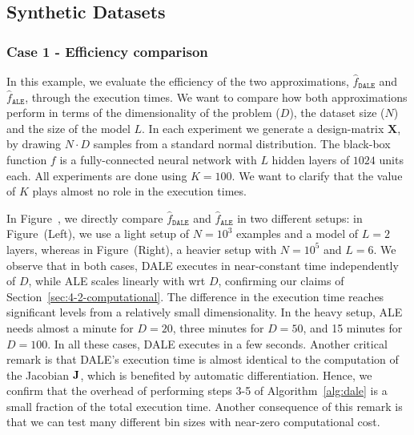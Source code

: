 \documentclass[wcp]{jmlr}
\newcommand{\dale}{\hat{f}_{\mathtt{DALE}}}
\begin{document}
\subsection{Synthetic Datasets}
\label{sec:5-1-artificial-experiments}
\subsubsection{Case 1 - Efficiency comparison}
\label{sec:case-1}

In this example, we evaluate the efficiency of the two approximations,
\(\dale\) and \(\hat{f}_{\mathtt{ALE}}\), through the
execution times. We want to compare how both approximations perform in
terms of the dimensionality of the problem (\(D\)), the dataset size
(\(N\)) and the size of the model \(L\). In each experiment we
generate a design-matrix \( \mathbf{X} \), by drawing \( N \cdot D \)
samples from a standard normal distribution. The black-box function
\(f \) is a fully-connected neural network with \(L\) hidden layers of
\( 1024 \) units each. All experiments are done using \(K=100\). We
want to clarify that the value of \(K\) plays almost no role in the
execution times.

In Figure~, we directly compare
\(\dale\) and \(\hat{f}_{\mathtt{ALE}}\) in two different
setups: in Figure~(Left), we use a light setup
of \(N=10^3\) examples and a model of \(L=2\) layers, whereas in
Figure~(Right), a heavier setup with
\(N=10^5\) and \(L=6\). We observe that in both cases, DALE executes
in near-constant time independently of \(D\), while ALE scales
linearly with wrt \(D\), confirming our claims of
Section~\ref{sec:4-2-computational}. The difference in the execution
time reaches significant levels from a relatively small
dimensionality. In the heavy setup, ALE needs almost a minute for
\(D=20\), three minutes for \(D=50\), and 15 minutes for \(D=100\). In
all these cases, DALE executes in a few seconds. Another critical
remark is that DALE's execution time is almost identical to the
computation of the Jacobian \( \mathbf{J} \), which is benefited by
automatic differentiation. Hence, we confirm that the overhead of
performing steps 3-5 of Algorithm~\ref{alg:dale} is a small fraction
of the total execution time. Another consequence of this remark is
that we can test many different bin sizes with near-zero computational
cost.
\end{document}
